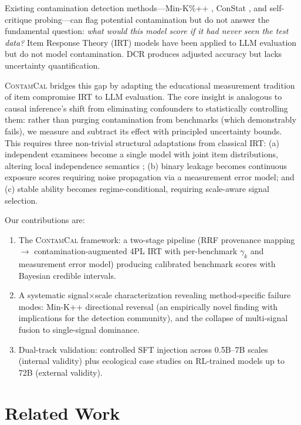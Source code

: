 \documentclass[11pt,a4paper]{article}
\newcommand{\method}{\textsc{ContamCal}}
\begin{document}
Existing contamination detection methods---Min-K\%++ \citep{shi2024detecting}, ConStat \citep{oren2024proving}, and self-critique probing---can flag potential contamination but do not answer the fundamental question: \emph{what would this model score if it had never seen the test data?}
Item Response Theory (IRT) models have been applied to LLM evaluation \citep{lalor2024aaai,polo2024tinybenchmarks} but do not model contamination.
DCR \citep{dong2024dcr} produces adjusted accuracy but lacks uncertainty quantification.

\method{} bridges this gap by adapting the educational measurement tradition of item compromise IRT \citep{eckerly2017,sinharay2017} to LLM evaluation.
The core insight is analogous to causal inference's shift from eliminating confounders to statistically controlling them: rather than purging contamination from benchmarks (which demonstrably fails), we measure and subtract its effect with principled uncertainty bounds.
This requires three non-trivial structural adaptations from classical IRT: (a) independent examinees become a single model with joint item distributions, altering local independence semantics \citep{mislevy1986}; (b) binary leakage becomes continuous exposure scores requiring noise propagation via a measurement error model; and (c) stable ability becomes regime-conditional, requiring scale-aware signal selection.

Our contributions are:
\begin{enumerate}
    \item The \method{} framework: a two-stage pipeline (RRF provenance mapping $\to$ contamination-augmented 4PL IRT with per-benchmark $\gamma_k$ and measurement error model) producing calibrated benchmark scores with Bayesian credible intervals.
    \item A systematic signal$\times$scale characterization revealing method-specific failure modes: Min-K++ directional reversal (an empirically novel finding with implications for the detection community), and the collapse of multi-signal fusion to single-signal dominance.
    \item Dual-track validation: controlled SFT injection across 0.5B--7B scales (internal validity) plus ecological case studies on RL-trained models up to 72B (external validity).
\end{enumerate}

\section{Related Work}
\label{sec:related}
\end{document}
